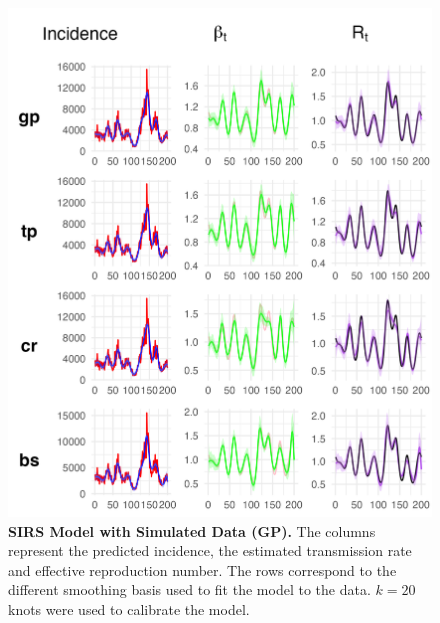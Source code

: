 \documentclass[
11pt, %
oneside, %
english, %
singlespacing, %
]{macthesis} %
\begin{document}
\begin{figure}[H]
\centering
\includegraphics[width=\textwidth]{figure/Simulated/unaggregated/sim_combined_gp.png}
\caption[SIRS model with simulated data (GP).]{\textbf{SIRS Model with Simulated Data (GP).} The columns represent the predicted incidence, the estimated transmission rate and effective reproduction number. The rows correspond to the different smoothing basis used to fit the model to the data. \(k=20\) knots were used to calibrate the model.}
\label{fig:sim_gp}
\end{figure}
\end{document}
